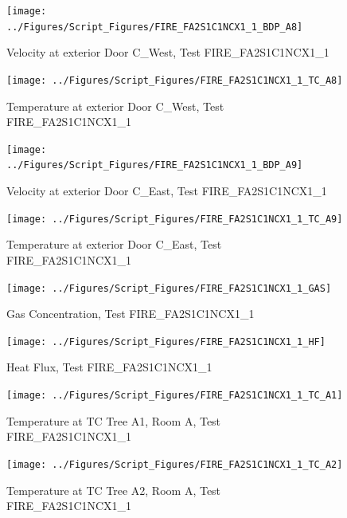 \documentclass[12pt,oneside]{book}
\begin{document}
\begin{figure}[!ht]
\texttt{[image: ../Figures/Script\_Figures/FIRE\_FA2S1C1NCX1\_1\_BDP\_A8]}
\caption{Velocity at exterior Door C\_West, Test FIRE\_FA2S1C1NCX1\_1}
\label{fig:FIRE_FA2S1C1NCX1_1_BDP_A8}
\end{figure}

\begin{figure}[!ht]
\texttt{[image: ../Figures/Script\_Figures/FIRE\_FA2S1C1NCX1\_1\_TC\_A8]}
\caption{Temperature at exterior Door C\_West, Test FIRE\_FA2S1C1NCX1\_1}
\label{fig:FIRE_FA2S1C1NCX1_1_TC_A8}
\end{figure}

\begin{figure}[!ht]
\texttt{[image: ../Figures/Script\_Figures/FIRE\_FA2S1C1NCX1\_1\_BDP\_A9]}
\caption{Velocity at exterior Door C\_East, Test FIRE\_FA2S1C1NCX1\_1}
\label{fig:FIRE_FA2S1C1NCX1_1_BDP_A9}
\end{figure}

\begin{figure}[!ht]
\texttt{[image: ../Figures/Script\_Figures/FIRE\_FA2S1C1NCX1\_1\_TC\_A9]}
\caption{Temperature at exterior Door C\_East, Test FIRE\_FA2S1C1NCX1\_1}
\label{fig:FIRE_FA2S1C1NCX1_1_TC_A9}
\end{figure}

\begin{figure}[!ht]
\texttt{[image: ../Figures/Script\_Figures/FIRE\_FA2S1C1NCX1\_1\_GAS]}
\caption{Gas Concentration, Test FIRE\_FA2S1C1NCX1\_1}
\label{fig:FIRE_FA2S1C1NCX1_1_GAS}
\end{figure}

\begin{figure}[!ht]
\texttt{[image: ../Figures/Script\_Figures/FIRE\_FA2S1C1NCX1\_1\_HF]}
\caption{Heat Flux, Test FIRE\_FA2S1C1NCX1\_1}
\label{fig:FIRE_FA2S1C1NCX1_1_HF}
\end{figure}

\begin{figure}[!ht]
\texttt{[image: ../Figures/Script\_Figures/FIRE\_FA2S1C1NCX1\_1\_TC\_A1]}
\caption{Temperature at TC Tree A1, Room A, Test FIRE\_FA2S1C1NCX1\_1}
\label{fig:FIRE_FA2S1C1NCX1_1_TC_A1}
\end{figure}

\begin{figure}[!ht]
\texttt{[image: ../Figures/Script\_Figures/FIRE\_FA2S1C1NCX1\_1\_TC\_A2]}
\caption{Temperature at TC Tree A2, Room A, Test FIRE\_FA2S1C1NCX1\_1}
\label{fig:FIRE_FA2S1C1NCX1_1_TC_A2}
\end{figure}
\end{document}
